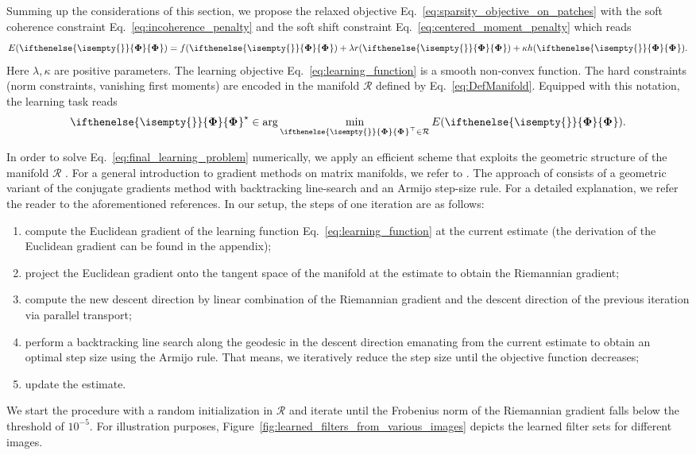 \documentclass[journal]{IEEEtran}
\newcommand{\AOF}[1]{\ifthenelse{\isempty{#1}}{\boldsymbol{\Phi}}{\boldsymbol{\Phi}_{#1}}}
\begin{document}
Summing up the considerations of this section, we propose the relaxed objective Eq.~\eqref{eq:sparsity_objective_on_patches} with the soft coherence constraint Eq.~\eqref{eq:incoherence_penalty} and the soft shift constraint Eq.~\eqref{eq:centered_moment_penalty} 
which reads 
\begin{equation} \label{eq:learning_function}
E(\AOF{}) = f(\AOF{}) + \lambda r(\AOF{}) + \kappa h(\AOF{}).
\end{equation}
Here $\lambda, \kappa$ are positive parameters.
The learning objective Eq.~\eqref{eq:learning_function} is a smooth non-convex function.
The hard constraints (norm constraints, vanishing first moments) are encoded in the manifold 
$\mathcal{R}$ defined by Eq.~\eqref{eq:DefManifold}.
Equipped with this notation, the learning task reads
\begin{equation} \label{eq:final_learning_problem}
\AOF{}^{\star} \in \arg \min_{\AOF{}^{\top} \in \mathcal{R}}  E(\AOF{}).
\end{equation}



In order to solve Eq.~\eqref{eq:final_learning_problem} numerically,
we apply an efficient scheme that exploits the geometric structure 
of the manifold $\mathcal{R}$ \cite{hawe2013,kiechle2015}.
For a general introduction to gradient methods on matrix manifolds, we refer to \cite{absil2009}.
The approach of  \cite{hawe2013,kiechle2015} consists of a geometric variant of the conjugate gradients method with backtracking line-search and an Armijo step-size rule.
For a detailed explanation, we refer the reader to the aforementioned references. 
In our setup, the steps of one iteration are as follows:
\begin{enumerate}
\item compute the Euclidean gradient of the learning function Eq.~\eqref{eq:learning_function} at the current estimate (the derivation of the Euclidean gradient can be found in the appendix);
\item project the Euclidean gradient onto the tangent space of the manifold at the estimate to obtain the Riemannian gradient;
\item compute the new descent direction by linear combination of the Riemannian gradient and the descent direction of the previous iteration via parallel transport;
\item perform a backtracking line search along the geodesic in the descent direction emanating from the current estimate to obtain an optimal step size using the Armijo rule. That means, we iteratively reduce the step size until the objective function decreases;
\item update the estimate.
\end{enumerate}
We start the procedure with a random initialization in $\mathcal{R}$ and iterate until the Frobenius norm of the Riemannian gradient falls below the threshold of
$10^{-5}$. For illustration purposes, Figure~\ref{fig:learned_filters_from_various_images} depicts the learned filter sets for different images.
\end{document}
